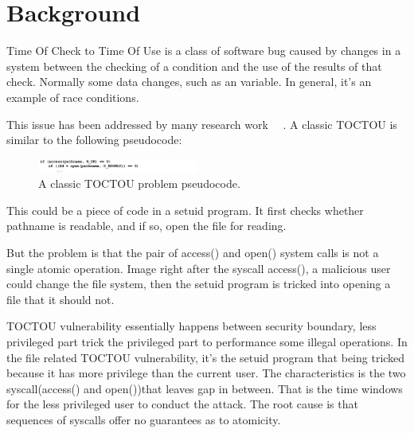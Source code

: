 
\section{Background}
\label{sec:background}


Time Of Check to Time Of Use is a class of software bug caused by changes in a system between the checking of a condition and the use of the results of that check. Normally some data changes, such as an variable. In general, it's an example of race conditions.

This issue has been addressed by many research work ~\cite{dean2004fixing}~\cite{borisov2005fixing}. A classic TOCTOU is similar to the following pseudocode:


\begin{figure}[th]
	\includegraphics[width=0.47\textwidth]{figures/toctou}
	\centering
	\caption{A classic TOCTOU problem pseudocode.}
	\label{fig:toctou}
\end{figure}


This could be a piece of code in a setuid program. It first checks whether pathname is readable, and if so, open the file for reading. 

But the problem is that the pair of access() and open() system calls is not a single atomic operation. Image right after the syscall access(), a malicious user could change the file system, then the setuid program is tricked into opening a file that it should not. 


TOCTOU vulnerability essentially happens between security boundary, less privileged part trick the privileged part to performance some illegal operations. In the file related TOCTOU vulnerability, it's the setuid program that being tricked because it has more privilege than the current user. The characteristics is the two syscall(access() and open())that leaves gap in between. That is the time windows for the less privileged user to conduct the attack. The root cause is that sequences of syscalls offer no guarantees as to atomicity. 


